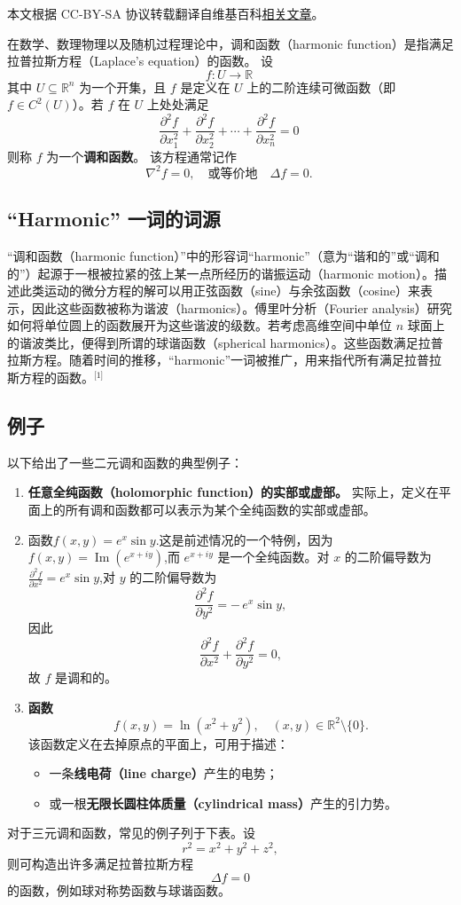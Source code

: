 
本文根据 CC-BY-SA 协议转载翻译自维基百科\href{https://en.wikipedia.org/wiki/Harmonic_function}{相关文章}。


在数学、数理物理以及随机过程理论中，调和函数（harmonic function）是指满足拉普拉斯方程（Laplace's equation）的函数。  
设
\[
f : U \to \mathbb{R}~
\]
其中 \(U \subseteq \mathbb{R}^n\) 为一个开集，且 \(f\) 是定义在 \(U\) 上的二阶连续可微函数（即 \(f \in C^2(U)\)）。若 \(f\) 在 \(U\) 上处处满足
\[
\frac{\partial^2 f}{\partial x_1^2}
+ \frac{\partial^2 f}{\partial x_2^2}
+ \cdots
+ \frac{\partial^2 f}{\partial x_n^2}
= 0~
\]
则称 \(f\) 为一个\textbf{调和函数}。  
该方程通常记作
\[
\nabla^2 f = 0,
\quad \text{或等价地} \quad
\Delta f = 0.~
\]
\subsection{“Harmonic” 一词的词源}
“调和函数（harmonic function）”中的形容词“harmonic”（意为“谐和的”或“调和的”）起源于一根被拉紧的弦上某一点所经历的谐振运动（harmonic motion）。描述此类运动的微分方程的解可以用正弦函数（sine）与余弦函数（cosine）来表示，因此这些函数被称为谐波（harmonics）。傅里叶分析（Fourier analysis）研究如何将单位圆上的函数展开为这些谐波的级数。若考虑高维空间中单位 \(n\) 球面上的谐波类比，便得到所谓的球谐函数（spherical harmonics）。这些函数满足拉普拉斯方程。随着时间的推移，“harmonic”一词被推广，用来指代所有满足拉普拉斯方程的函数。\(^\text{[1]}\)  
\subsection{例子}
以下给出了一些二元调和函数的典型例子：
\begin{enumerate}
  \item \textbf{任意全纯函数（holomorphic function）的实部或虚部。}  
  实际上，定义在平面上的所有调和函数都可以表示为某个全纯函数的实部或虚部。

  \item 函数$f(x, y) = e^{x} \sin y$.这是前述情况的一个特例，因为$f(x, y) = \operatorname{Im}\!\left(e^{x + i y}\right)$,而 \( e^{x + i y} \) 是一个全纯函数。对 \(x\) 的二阶偏导数为$\frac{\partial^2 f}{\partial x^2} = e^{x} \sin y$,对 \(y\) 的二阶偏导数为
  \[
  \frac{\partial^2 f}{\partial y^2} = -\, e^{x} \sin y,
  \]
  因此
  \[
  \frac{\partial^2 f}{\partial x^2} + \frac{\partial^2 f}{\partial y^2} = 0,
  \]
  故 \(f\) 是调和的。

  \item \textbf{函数}
  \[
  f(x, y) = \ln\!\left(x^2 + y^2\right),
  \quad (x, y) \in \mathbb{R}^2 \setminus \{0\}.
  \]
  该函数定义在去掉原点的平面上，可用于描述：
  \begin{itemize}
    \item 一条\textbf{线电荷（line charge）}产生的电势；
    \item 或一根\textbf{无限长圆柱体质量（cylindrical mass）}产生的引力势。
  \end{itemize}
\end{enumerate}

\vspace{1em}
\noindent
对于三元调和函数，常见的例子列于下表。设
\[
r^2 = x^2 + y^2 + z^2,
\]
则可构造出许多满足拉普拉斯方程
\[
\Delta f = 0
\]
的函数，例如球对称势函数与球谐函数。
